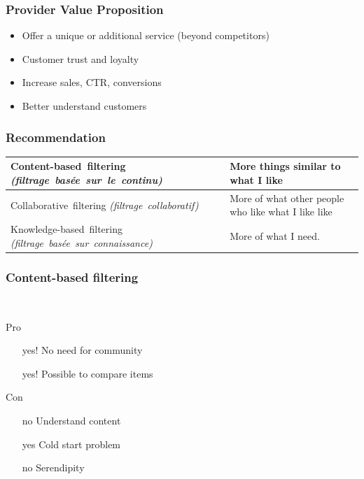 \begin{frame}
  \frametitle{Provider Value Proposition}

  \begin{itemize}
  \item Offer a unique or additional service (beyond competitors)
  \item Customer trust and loyalty
  \item Increase sales, CTR, conversions
  \item Better understand customers
  \end{itemize}
\end{frame}


\begin{frame}
  \frametitle{Recommendation}

  \begin{tabular}{|p{5.7cm}|p{4cm}|}
    \hline
    \topstrut\hbox{Content-based filtering}
    \hbox{\it (filtrage basée sur le continu)}
    &
    More things similar to what I like\bottomstrut
    \\
    \hline
    \topstrut\hbox{Collaborative filtering}
    \hbox{\it (filtrage collaboratif)}
    &
    More of what other people who like what I like like
    \bottomstrut
    \\
    \hline
    \topstrut\hbox{Knowledge-based filtering}
    \hbox{\it (filtrage basée sur connaissance)}\bottomstrut
    &
    More of what I need.\bottomstrut
    \\
    \hline
  \end{tabular}
\end{frame}

\begin{frame}[t]
  \frametitle{Content-based filtering}
  \textit{}\\
  \textit{}

  Pro
  \begin{itemize}
  \item [yes!] No need for community
  \item [yes!] Possible to compare items 
  \end{itemize}

  \bigskip
  Con
  \begin{itemize}
  \item [no] Understand content
  \item [yes] Cold start problem
  \item [no] Serendipity
  \end{itemize}
\end{frame}

